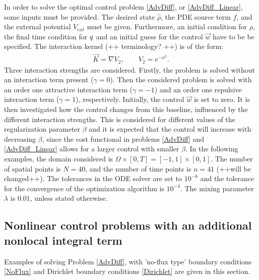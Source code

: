 
In order to solve the optimal control problem \eqref{AdvDiff}, or \eqref{AdvDiff_Linear}, some inputs must be provided. The desired state $\widehat \rho$, the PDE source term $f$, and the external potential $V_{ext}$ must be given. Furthermore, an initial condition for $\rho$, the final time condition for $q$ and an initial guess for the control $\vec{w}$ have to be be specified. 
The interaction kernel (++ terminology? ++) is of the form:
\begin{align*}
\vec{K} = \nabla V_2, \qquad V_2 = e^{-x^2}.
\end{align*}
Three interaction strengths are considered. Firstly, the problem is solved without an interaction term present ($\gamma = 0$). Then the considered problem is solved with an order one attractive interaction term ($\gamma = -1$) and an order one repulsive interaction term ($\gamma = 1$), respectively. Initially, the control $\vec{w}$ is set to zero. It is then investigated how the control changes from this baseline, influenced by the different interaction strengths. This is considered for different values of the regularization parameter $\beta$ and it is expected that the control will increase with decreasing $\beta$, since the cost functional in problems \eqref{AdvDiff} and \eqref{AdvDiff_Linear} allows for a larger control with smaller $\beta$.
In the following examples, the domain considered is $\Omega \times [0,T] = [-1,1] \times [0,1]$. The number of spatial points is $N=40$, and the number of time points is $n=41$ (++will be changed++). The tolerances in the ODE solver are set to $10^{-8}$ and the tolerance for the convergence of the optimization algorithm is $10^{-4}$. The mixing parameter $\lambda$ is $0.01$, unless stated otherwise.
\subsection{Nonlinear control problems with an additional nonlocal integral term}
Examples of solving Problem \eqref{AdvDiff}, with 'no-flux type' boundary conditions \eqref{NoFlux} and Dirichlet boundary conditions \eqref{Dirichlet} are given in this section. 
 
